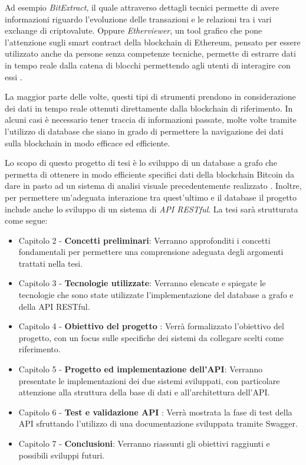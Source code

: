 Ad esempio \textit{BitExtract}, il quale attraverso dettagli tecnici permette di avere informazioni riguardo l'evoluzione delle transazioni e le relazioni tra i vari exchange di criptovalute.
Oppure \textit{Etherviewer}, un tool grafico che pone l'attenzione sugli smart contract della blockchain di Ethereum, pensato per essere utilizzato anche da persone senza competenze tecniche, permette di estrarre dati in tempo reale dalla catena di blocchi permettendo agli utenti di interagire con essi \cite{vis-tools-overview}. 

La maggior parte delle volte, questi tipi di strumenti prendono in considerazione dei dati in tempo reale ottenuti direttamente dalla blockchain di riferimento.
In alcuni casi è necessario tener traccia di informazioni passate, molte volte tramite l'utilizzo di database che siano in grado di permettere la navigazione dei dati sulla blockchain in modo efficace ed efficiente.


Lo scopo di questo progetto di tesi è lo sviluppo di un database a grafo che permetta di ottenere in modo efficiente specifici dati della blockchain Bitcoin da dare in pasto ad un sistema di analisi visuale precedentemente realizzato \cite{TesiBITVAS}. Inoltre, per permettere un'adeguata interazione tra quest'ultimo e il database il progetto include anche lo sviluppo di un sistema di \emph{API RESTful}. La tesi sarà strutturata come segue:


\begin{itemize}
    \item Capitolo 2 - \textbf{Concetti preliminari}: Verranno approfonditi i concetti fondamentali per permettere una comprensione adeguata degli argomenti trattati nella tesi.

    \item Capitolo 3 - \textbf{Tecnologie utilizzate}: Verranno elencate e spiegate le tecnologie che sono state utilizzate l'implementazione del database a grafo e della API RESTful.
    
    \item Capitolo 4 - \textbf{Obiettivo del progetto} : Verrà formalizzato l'obiettivo del progetto, con un focus sulle specifiche dei sistemi da collegare scelti come riferimento.

    \item Capitolo 5 - \textbf{Progetto ed implementazione dell'API}: Verranno presentate le implementazioni dei due sistemi sviluppati, con particolare attenzione alla struttura della base di dati e all'architettura dell'API.

    \item Capitolo 6 - \textbf{Test e validazione API} : Verrà mostrata la fase di test della API  sfruttando l'utilizzo di una documentazione sviluppata tramite Swagger.


    \item Capitolo 7 - \textbf{Conclusioni}: Verranno riassunti gli obiettivi raggiunti e possibili sviluppi futuri.

\thispagestyle{mystyle}
\end{itemize}
